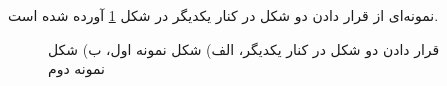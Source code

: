 نمونه‌ای از قرار دادن دو شکل در کنار یکدیگر در شکل
\ref{Fig:SampleFigure2_2}
آورده شده است.

\begin{figure}[!htb]
\centering
{}
\quad
{}
\caption{
قرار دادن دو شکل در کنار یکدیگر، الف) شکل نمونه اول،
ب) شکل نمونه دوم
}
\label{Fig:SampleFigure2_2}
\end{figure}





